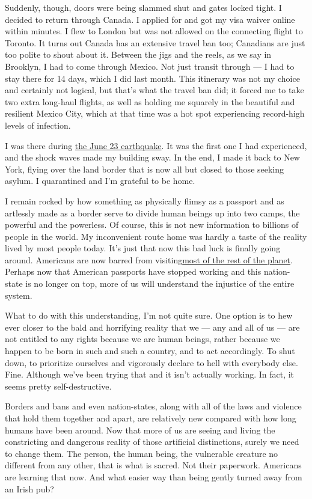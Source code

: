 Suddenly, though, doors were being slammed shut and gates locked tight.
I decided to return through Canada. I applied for and got my visa waiver
online within minutes. I flew to London but was not allowed on the
connecting flight to Toronto. It turns out Canada has an extensive
travel ban too; Canadians are just too polite to shout about it. Between
the jigs and the reels, as we say in Brooklyn, I had to come through
Mexico. Not just transit through --- I had to stay there for 14 days,
which I did last month. This itinerary was not my choice and certainly
not logical, but that's what the travel ban did; it forced me to take
two extra long-haul flights, as well as holding me squarely in the
beautiful and resilient Mexico City, which at that time was a hot spot
experiencing record-high levels of infection.

I was there during
\href{https://www.nytimes3xbfgragh.onion/2020/06/23/world/mexico-earthquake.html}{the
June 23 earthquake}. It was the first one I had experienced, and the
shock waves made my building sway. In the end, I made it back to New
York, flying over the land border that is now all but closed to those
seeking asylum. I quarantined and I'm grateful to be home.

I remain rocked by how something as physically flimsy as a passport and
as artlessly made as a border serve to divide human beings up into two
camps, the powerful and the powerless. Of course, this is not new
information to billions of people in the world. My inconvenient route
home was hardly a taste of the reality lived by most people today. It's
just that now this bad luck is finally going around. Americans are now
barred from
visiting\href{https://www.cnn.com/travel/article/us-international-travel-covid-19/index.html}{most
of the rest of the planet}. Perhaps now that American passports have
stopped working and this nation-state is no longer on top, more of us
will understand the injustice of the entire system.

What to do with this understanding, I'm not quite sure. One option is to
hew ever closer to the bald and horrifying reality that we --- any and
all of us --- are not entitled to any rights because we are human
beings, rather because we happen to be born in such and such a country,
and to act accordingly. To shut down, to prioritize ourselves and
vigorously declare to hell with everybody else. Fine. Although we've
been trying that and it isn't actually working. In fact, it seems pretty
self-destructive.

Borders and bans and even nation-states, along with all of the laws and
violence that hold them together and apart, are relatively new compared
with how long humans have been around. Now that more of us are seeing
and living the constricting and dangerous reality of those artificial
distinctions, surely we need to change them. The person, the human
being, the vulnerable creature no different from any other, that is what
is sacred. Not their paperwork. Americans are learning that now. And
what easier way than being gently turned away from an Irish pub?

